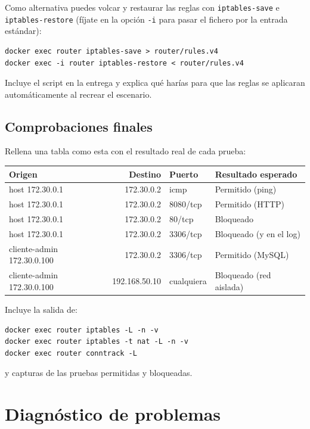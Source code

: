 \documentclass[a4paper]{article}
\begin{document}
Como alternativa puedes volcar y restaurar las reglas con \texttt{iptables-save} e \texttt{iptables-restore} (fíjate en la opción \texttt{-i} para pasar el fichero por la entrada estándar):

\begin{verbatim}
docker exec router iptables-save > router/rules.v4
docker exec -i router iptables-restore < router/rules.v4
\end{verbatim}

Incluye el script en la entrega y explica qué harías para que las reglas se aplicaran automáticamente al recrear el escenario.
\subsection{Comprobaciones finales}
\label{sec:org413cfa9}

Rellena una tabla como esta con el resultado real de cada prueba:

\begin{center}
\begin{tabular}{lrll}
Origen & Destino & Puerto & Resultado esperado\\
\hline
host 172.30.0.1 & 172.30.0.2 & icmp & Permitido (ping)\\
host 172.30.0.1 & 172.30.0.2 & 8080/tcp & Permitido (HTTP)\\
host 172.30.0.1 & 172.30.0.2 & 80/tcp & Bloqueado\\
host 172.30.0.1 & 172.30.0.2 & 3306/tcp & Bloqueado (y en el log)\\
cliente-admin 172.30.0.100 & 172.30.0.2 & 3306/tcp & Permitido (MySQL)\\
cliente-admin 172.30.0.100 & 192.168.50.10 & cualquiera & Bloqueado (red aislada)\\
\end{tabular}
\end{center}

Incluye la salida de:

\begin{verbatim}
docker exec router iptables -L -n -v
docker exec router iptables -t nat -L -n -v
docker exec router conntrack -L
\end{verbatim}

y capturas de las pruebas permitidas y bloqueadas.
\section{Diagnóstico de problemas}
\label{sec:org648ccd6}
\end{document}
